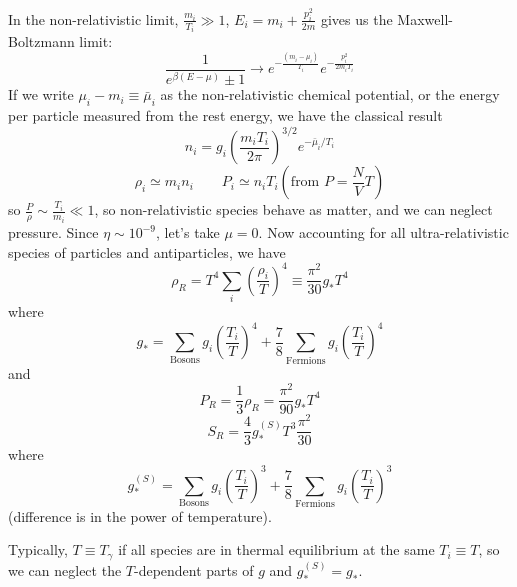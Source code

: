 \documentclass[a4paper,twoside,master.tex]{subfiles}
\begin{document}
In the non-relativistic limit, $ \frac{m_i}{T_i} \gg 1 $, $ E_i = m_i + \frac{p_i^2}{2m} $ gives us the Maxwell-Boltzmann limit:
\begin{equation}
    \frac{1}{e^{\beta (E - \mu)} \pm 1} \to e^{- \frac{(m_i - \mu_i)}{T_i}} e^{- \frac{p_i^2}{2m_i T_i}}
\end{equation}
If we write $ \mu_i - m_i \equiv \bar{\mu}_i $ as the non-relativistic chemical potential, or the energy per particle measured from the rest energy, we have the classical result
\begin{equation}
    n_i = g_i \left( \frac{m_i T_i}{2 \pi} \right)^{3/2} e^{- \bar{\mu}_i / T_i}
\end{equation}
\begin{equation}
    \rho_i \simeq m_i n_i \qquad P_i \simeq n_i T_i \left( \text{from } P = \frac{N}{V} T \right)
\end{equation}
so $ \frac{P}{\rho} \sim \frac{T_i}{m_i}\ll 1 $, so non-relativistic species behave as matter, and we can neglect pressure. Since $ \eta \sim 10^{-9} $, let's take $ \mu = 0 $. Now accounting for all ultra-relativistic species of particles and antiparticles, we have
\begin{equation}
    \rho_R = T^4 \sum_i \left( \frac{\rho_i}{T} \right)^4 \equiv \frac{\pi^2}{30} g_{*} T^4
\end{equation}
where
\begin{equation}
    g_{*} = \sum_{\text{Bosons}} g_i \left( \frac{T_i}{T} \right)^4 + \frac{7}{8} \sum_{\text{Fermions}} g_i \left( \frac{T_i}{T} \right)^4
\end{equation}
and
\begin{equation}
    P_R = \frac{1}{3} \rho_R = \frac{\pi^2}{90} g_* T^4
\end{equation}
\begin{equation}
    S_R = \frac{4}{3} g_*^{(S)} T^3 \frac{\pi^2}{30}
\end{equation}
where
\begin{equation}
    g_{*}^{(S)} = \sum_{\text{Bosons}} g_i \left( \frac{T_i}{T} \right)^3 + \frac{7}{8} \sum_{\text{Fermions}} g_i \left( \frac{T_i}{T} \right)^3
\end{equation}
(difference is in the power of temperature).

Typically, $ T \equiv T_{\gamma} $ if all species are in thermal equilibrium at the same $ T_i \equiv T $, so we can neglect the $ T $-dependent parts of $ g $ and $ g_*^{(S)} = g_* $.
\end{document}
